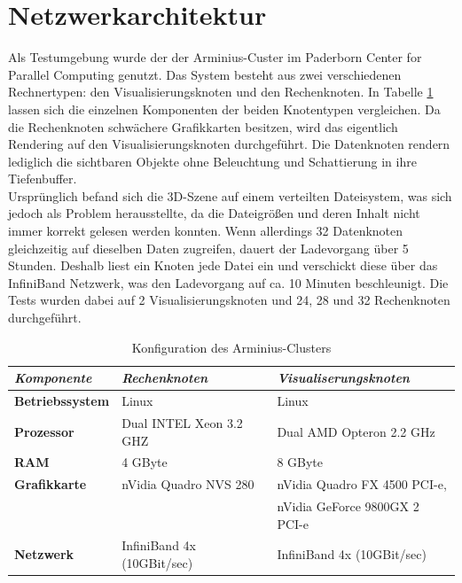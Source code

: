\section{Netzwerkarchitektur}
\label{sec:impl:netzwerkarchitektur}
Als Testumgebung wurde der der Arminius-Custer im Paderborn Center for Parallel Computing \cite{pc2} genutzt. Das System besteht aus zwei verschiedenen Rechnertypen: den Visualisierungsknoten und den Rechenknoten. In Tabelle \ref{tab:impl:arminius} lassen sich die einzelnen Komponenten der beiden Knotentypen vergleichen. Da die Rechenknoten schwächere Grafikkarten besitzen, wird das eigentlich Rendering auf den Visualisierungsknoten durchgeführt. Die Datenknoten rendern lediglich die sichtbaren Objekte ohne Beleuchtung und Schattierung in ihre Tiefenbuffer.\\
Ursprünglich befand sich die 3D-Szene auf einem verteilten Dateisystem, was sich jedoch als Problem herausstellte, da die Dateigrößen und deren Inhalt nicht immer korrekt gelesen werden konnten. Wenn allerdings 32 Datenknoten gleichzeitig auf dieselben Daten zugreifen, dauert der Ladevorgang über 5 Stunden. Deshalb liest ein Knoten jede Datei ein und verschickt diese über das InfiniBand Netzwerk, was den Ladevorgang auf ca. 10 Minuten beschleunigt. Die Tests wurden dabei auf 2 Visualisierungsknoten und 24, 28 und 32 Rechenknoten durchgeführt.

\begin{table}
 \centering
 \begin{tabular}{lll} %
  \toprule %
  \textit{Komponente} & \textit{Rechenknoten} & \textit{Visualiserungsknoten} \\
  \midrule
  \textbf{Betriebssystem} & Linux & Linux \\
  \textbf{Prozessor} & Dual INTEL Xeon 3.2 GHZ & Dual AMD Opteron 2.2 GHz \\
  \textbf{RAM} & 4 GByte & 8 GByte \\
  \textbf{Grafikkarte} & nVidia Quadro NVS 280 & nVidia Quadro FX 4500 PCI-e, \\
  \;&\;& nVidia GeForce 9800GX 2 PCI-e \\
  \textbf{Netzwerk} & InfiniBand 4x (10GBit/sec) & InfiniBand 4x (10GBit/sec) \\
  \bottomrule
 \end{tabular} 
 \caption{Konfiguration des Arminius-Clusters}
 \label{tab:impl:arminius}
\end{table}

